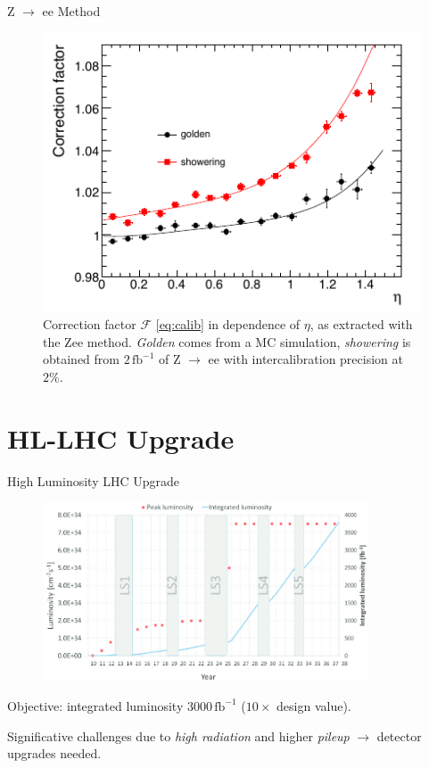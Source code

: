 \documentclass[10pt]{beamer}
\begin{document}
\begin{frame}{Z $\rightarrow$ ee Method}
    \begin{figure}
        \centering
        \includegraphics[width=.75\textwidth]{./img/Zee_corr_factor.png}
        \caption{Correction factor $\mathcal{F}$ \eqref{eq:calib} in dependence of $ \eta$, as extracted with the Zee method. \emph{Golden} comes from a MC simulation, \emph{showering} is obtained from $2\,\text{fb}^{-1}$ of Z $\rightarrow$ ee with intercalibration precision at $2\%$.}
        \label{fig:Zee_correction_factor}
    \end{figure}
\end{frame}

\section{HL-LHC Upgrade}

\begin{frame}{High Luminosity LHC Upgrade}
    \begin{figure}
        \centering
        \includegraphics[height=150pt]{img/upgrade/luminosity.png}
    \end{figure}{}
    Objective: integrated luminosity $3000\,\text{fb}^{-1}$ ($10\times$ design value).
    
    Significative challenges due to \emph{high radiation} and higher \emph{pileup} $\rightarrow$ detector upgrades needed.
    
\end{frame}
\end{document}
